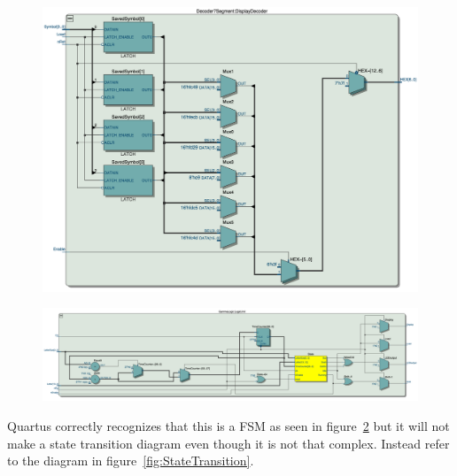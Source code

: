 \documentclass{article}
\begin{document}
\begin{figure}[h]
    \centering
    \includegraphics[width=1\textwidth]{Figures/RTL_Display.jpg}
    \label{fig:RTL_Decoder}
\end{figure}

\begin{figure}[h]
    \centering
    \includegraphics[width=1\textwidth]{Figures/RTL_Logic.jpg}
    \label{fig:RTL_Logic}
\end{figure}

Quartus correctly recognizes that this is a FSM as seen in figure~\ref{fig:RTL_Logic} but it will not make a state transition diagram even though it is not that complex. Instead refer to the diagram in figure~\ref{fig:StateTransition}.

\clearpage
\end{document}
